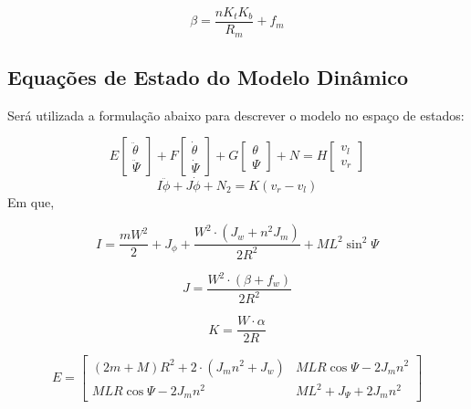 \documentclass[12pt]{article}
\begin{document}
\begin{equation*}
    \beta = \frac{n K_t K_b}{R_m} + f_m
\end{equation*}

\subsection{Equações de Estado do Modelo Dinâmico}

\quad Será utilizada a formulação abaixo para descrever o modelo no espaço de estados: 

\begin{equation}
E 
\begin{bmatrix}
  \ddot{\theta} \\ 
  \ddot{\Psi}
\end{bmatrix}
 +F 
 \begin{bmatrix}
  \dot{\theta} \\ 
  \dot{\Psi}
\end{bmatrix}
+G
\begin{bmatrix}
  \theta \\ 
  \Psi
\end{bmatrix}
+N = H 
\begin{bmatrix}
  v_l \\ 
  v_r
\end{bmatrix}
\end{equation}
\begin{equation}
    I\ddot{\phi} + J\dot{\phi} + N_2 = K(v_r - v_l)
\end{equation}
\quad Em que, 

\begin{equation}
     I = \frac{m W^2}{2} + J_{\phi} + \frac{W^2 \cdot (J_w + n^2J_m)}{2R^2} + ML^2{\sin^2{\Psi}} 
\end{equation}

\begin{equation}
     J = \frac{W^2 \cdot (\beta + f_w)}{2R^2}  
\end{equation}

\begin{equation}
     K = \frac{W \cdot \alpha}{2R}  
\end{equation}

\begin{equation}
E = 
\begin{bmatrix}
  (2m + M)R^2 + 2\cdot(J_mn^2 + J_w) &  MLR \cos{\Psi} - 2J_m n^2 \\ 
  MLR\cos{\Psi} - 2J_mn^2 & ML^2 + J_\Psi + 2J_m n^2
\end{bmatrix}
\end{equation}
\end{document}
